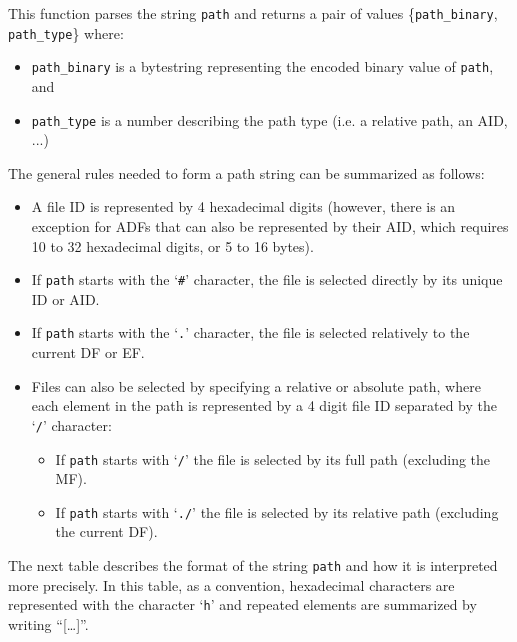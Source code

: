 \documentclass[11pt]{report}
\newcommand{\syn}[1]{\texttt{#1}}
\begin{document}
  This function parses the string \syn{path} and returns a pair of values \{\syn{path\_binary}, \syn{path\_type}\}
  where:
  \begin{itemize}
  \item{\syn{path\_binary} is a bytestring representing the encoded binary value of \syn{path}, and}
  \item{\syn{path\_type} is a number describing the path type (i.e. a relative path, an AID, ...)}
  \end{itemize}

  The general rules needed to form a path string can be summarized as follows:
  \begin{itemize}
  \item{A file ID is represented by 4 hexadecimal digits 
    (however, there is an exception for ADFs that can also be represented by their AID, 
     which requires 10 to 32 hexadecimal digits, or 5 to 16 bytes).}
  \item{If \syn{path} starts with the `\syn{\#}' character, the file is selected directly by its unique ID or AID.}
  \item{If \syn{path} starts with the `\syn{.}' character, the file is selected relatively to the current DF or EF.}
  \item{Files can also be selected by specifying a relative or absolute path, 
    where each element in the path is represented by a 4 digit file ID separated by the `\syn{/}' character:}
     \begin{itemize}
     \item{If \syn{path} starts with `\syn{/}' the file is selected by its full path (excluding the MF).}
     \item{If \syn{path} starts with `\syn{./}' the file is selected by its relative path (excluding the current DF).}
     \end{itemize}
  \end{itemize}

  The next table describes the format of the string \syn{path} and how it is interpreted more precisely. 
  In this table, as a convention, hexadecimal characters are represented with the character `\texttt{h}' 
  and repeated elements are summarized by writing ``[\ldots ]''.
\end{document}
